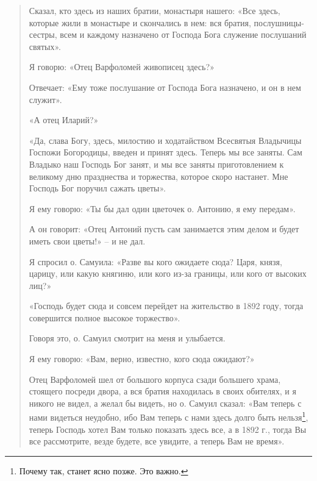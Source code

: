 \begin{quotation}

Сказал, кто здесь из наших братии, монастыря нашего: «Все здесь, которые жили в монастыре и скончались в нем: вся братия, послушницы-сестры, всем и каждому назначено от Господа Бога служение послушаний святых». 

Я говорю: «Отец Варфоломей живописец здесь?»

Отвечает: «Ему тоже послушание от Господа Бога назначено, и он в нем служит». 

«А отец Иларий?» 

«Да, слава Богу, здесь, милостию и ходатайством Всесвятыя Владычицы Госпожи Богородицы, введен и принят здесь. Теперь мы все заняты. Сам Владыко наш Господь Бог занят, и мы все заняты приготовлением к великому дню празднества и торжества, которое скоро настанет. Мне Господь Бог поручил сажать цветы». 

Я ему говорю: «Ты бы дал один цветочек о. Антонию, я ему передам». 

А он говорит: «Отец Антоний пусть сам занимается этим делом и будет иметь свои цветы!» – и не дал. 

Я спросил о. Самуила: «Разве вы кого ожидаете сюда? Царя, князя, царицу, или какую княгиню, или кого из-за границы, или кого от высоких лиц?» 

«Господь будет сюда и совсем перейдет на жительство в 1892 году, тогда совершится полное высокое торжество».

Говоря это, о. Самуил смотрит на меня и улыбается. 

Я ему говорю: «Вам, верно, известно, кого сюда ожидают?» 

Отец Варфоломей шел от большого корпуса сзади большего храма, стоящего посреди двора, а вся братия находилась в своих обителях, и я никого не видел, а желал бы видеть, но о. Самуил сказал: «Вам теперь с нами видеться неудобно, ибо Вам теперь с нами здесь долго быть нельзя\footnote{Почему так, станет ясно позже. Это важно.}, теперь Господь хотел Вам только показать здесь все, а в 1892 г., тогда Вы все рассмотрите, везде будете, все увидите, а теперь Вам не время».


\end{quotation}
